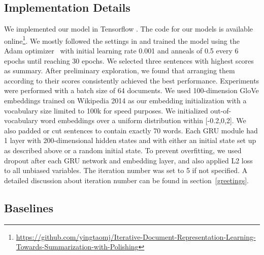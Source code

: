 \documentclass[11pt,a4paper]{article}
\begin{document}
\subsection{Implementation Details}
\def\UrlBreaks{\do\A\do\B\do\C\do\D\do\E\do\F\do\G\do\H\do\I\do\J\do\K\do\L\do\M\do\N\do\O\do\P\do\Q\do\R\do\S\do\T\do\U\do\V\do\W\do\X\do\Y\do\Z\do\do\^\do\_\do\`\do\a\do\b\do\c\do\d\do\e\do\f\do\g\do\h\do\i\do\j\do\k\do\l\do\m\do\n\do\o\do\p\do\q\do\r\do\s\do\t\do\u\do\v\do\w\do\x\do\y\do\z\do\0\do\1\do\2\do\3\do\4\do\5\do\6\do\7\do\8\do\9\do\.\do\@\do\\\do\/\do\!\do\_\do\|\do\;\do\>\do\do\,\do\?\do\'\do+\do\=\do\#}

We implemented our model in Tensorflow \cite{abadi2016tensorflow}. The code for our models is available online\footnote{\url{https://github.com/yingtaomj/Iterative-Document-Representation-Learning-Towards-Summarization-with-Polishing}}.
We mostly followed the settings in \cite{Nallapati2016SummaRuNNer} and trained the model using the Adam optimizer~\cite{Kingma2014Adam} with initial learning rate 0.001 and anneals of 0.5 every 6 epochs until reaching 30 epochs.
We selected three sentences with highest scores as summary. After preliminary exploration, we found that arranging them according to their scores consistently achieved the best performance.
Experiments were performed with a batch size of 64 documents. 
We used 100-dimension GloVe \cite{Pennington2014Glove} embeddings trained on Wikipedia 2014 as our embedding initialization with a vocabulary size limited to 100k for speed purposes.
We initialized out-of-vocabulary word embeddings over a uniform distribution within [-0.2,0,2].
We also padded or cut sentences to contain exactly 70 words. 
Each GRU module had 1 layer with 200-dimensional hidden states and with either an initial state set up as described above or a random initial state. 
To prevent overfitting, we used dropout after each GRU network and embedding layer, and also applied L2 loss to all unbiased variables.  
The iteration number was set to 5 if not specified. A detailed discussion about iteration number can be found in section~\ref{greetings}.

\subsection{Baselines}
\end{document}
